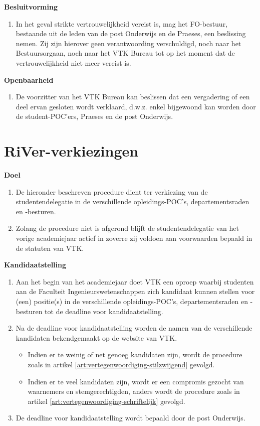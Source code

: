     \textbf{Besluitvorming}\label{art:bureau-besluit}
    \begin{enumerate}
    \item In het geval strikte vertrouwelijkheid vereist is, mag het FO-bestuur, bestaande uit de leden van de post Onderwijs en de Praeses, een beslissing nemen. Zij zijn hierover geen verantwoording verschuldigd, noch naar het Bestuursorgaan, noch naar het VTK Bureau tot op het moment dat de vertrouwelijkheid niet meer vereist is.
    \end{enumerate}

    \textbf{Openbaarheid}
    \begin{enumerate}
    \item De voorzitter van het VTK Bureau kan beslissen dat een vergadering of een deel ervan gesloten wordt verklaard, d.w.z. enkel bijgewoond kan worden door de student-POC'ers, Praeses en de post Onderwijs.
    \end{enumerate}

\section{RiVer-verkiezingen}\label{sec:vertegenwoordiging-verkiezing}

    \textbf{Doel}
    \begin{enumerate}
    \item De hieronder beschreven procedure dient ter verkiezing van de studentendelegatie in de verschillende opleidings-POC's, departementsraden en -besturen. 
    \item Zolang de procedure niet is afgerond blijft de studentendelegatie van het vorige academiejaar actief in zoverre zij voldoen aan voorwaarden bepaald in de statuten van VTK.
    \end{enumerate}
    
    \textbf{Kandidaatstelling}
    \begin{enumerate}
    \item Aan het begin van het academiejaar doet VTK een oproep waarbij studenten aan de Faculteit Ingenieurswetenschappen zich kandidaat kunnen stellen voor (een) positie(s) in de verschillende opleidings-POC's, departementsraden en -besturen tot de deadline voor kandidaatstelling.
    \item Na de deadline voor kandidaatstelling worden de namen van de verschillende kandidaten bekendgemaakt op de website van VTK.
        \begin{itemize}
        \item Indien er te weinig of net genoeg kandidaten zijn, wordt de procedure zoals in artikel \ref{art:vertegenwoordiging-stilzwijgend} gevolgd.
        \item Indien er te veel kandidaten zijn, wordt er een compromis gezocht van waarnemers en stemgerechtigden, anders wordt de procedure zoals in artikel \ref{art:vertegenwoordiging-schriftelijk} gevolgd.
        \end{itemize}
    \item De deadline voor kandidaatstelling wordt bepaald door de post Onderwijs.
    \end{enumerate}
    
